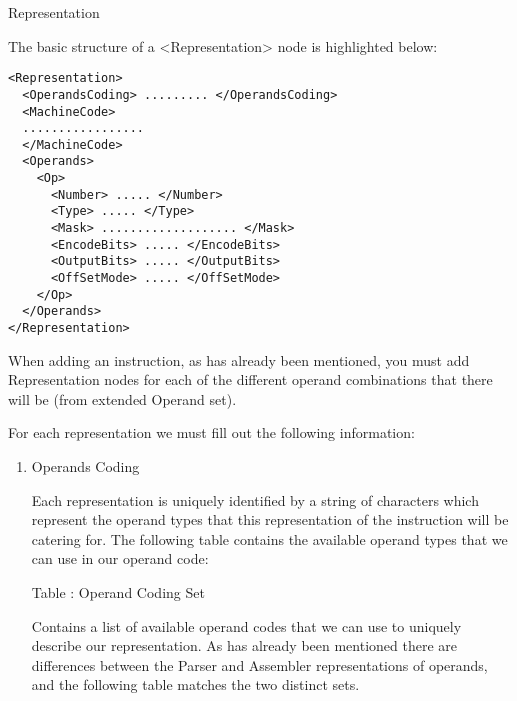 \begin{enumerate}
Representation

The basic structure of a <Representation> node is highlighted below:

\begin{verbatim}
<Representation>
  <OperandsCoding> ......... </OperandsCoding>
  <MachineCode>
  .................
  </MachineCode>
  <Operands>
    <Op>
      <Number> ..... </Number>
      <Type> ..... </Type>
      <Mask> ................... </Mask>
      <EncodeBits> ..... </EncodeBits>
      <OutputBits> ..... </OutputBits>
      <OffSetMode> ..... </OffSetMode>
    </Op>
  </Operands>
</Representation>
\end{verbatim}

When adding an instruction, as has already been mentioned, you must add Representation nodes for each of the different operand combinations that there will be (from extended Operand set).

For each representation we must fill out the following information:

\begin{enumerate}

\item Operands Coding

Each representation is uniquely identified by a string of characters which represent the operand types that this representation of the instruction will be catering for. The following table contains the available operand types that we can use in our operand code:

Table : Operand Coding Set

Contains a list of available operand codes that we can use to uniquely describe our representation. As has already been mentioned there are differences between the Parser and Assembler representations of operands, and the following table matches the two distinct sets.



\end{enumerate}
\end{enumerate}
